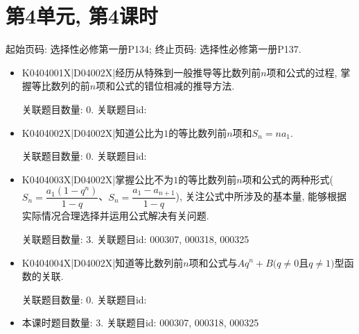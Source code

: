 \section*{第4单元, 第4课时}
起始页码: 选择性必修第一册P134; 终止页码: 选择性必修第一册P137.
\begin{itemize}
\item K0404001X|D04002X|经历从特殊到一般推导等比数列前$n$项和公式的过程, 掌握等比数列的前$n$项和公式的错位相减的推导方法.

关联题目数量: 0. 关联题目id: 

\item K0404002X|D04002X|知道公比为$1$的等比数列前$n$项和$S_{n}=na_{1}$.

关联题目数量: 0. 关联题目id: 

\item K0404003X|D04002X|掌握公比不为$1$的等比数列前$n$项和公式的两种形式($S_{n}=\dfrac{a_{1}(1-q^{n})}{1-q}$、$S_{n}=\dfrac{a_{1}-a_{n+1}}{1-q}$), 关注公式中所涉及的基本量, 能够根据实际情况合理选择并运用公式解决有关问题.

关联题目数量: 3. 关联题目id: 000307, 000318, 000325

\item K0404004X|D04002X|知道等比数列前$n$项和公式与$Aq^n+B(q\neq 0$且$q\neq 1)$型函数的关联.

关联题目数量: 0. 关联题目id: 

\item 本课时题目数量: 3. 关联题目id: 000307, 000318, 000325

\end{itemize}

